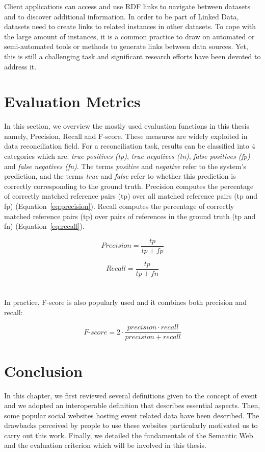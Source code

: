 Client applications can access and use RDF links to navigate between datasets and to discover additional information. In order to be part of Linked Data, datasets need to create links to related instances in other datasets. To cope with the large amount of instances, it is a common practice to draw on automated or semi-automated tools or methods to generate links between data sources. Yet, this is still a challenging task and significant research efforts have been devoted to address it.

\section{Evaluation Metrics} \label{sec:evaluation-metric-back}
In this section, we overview the mostly used evaluation functions in this thesis namely, Precision, Recall and F-score. These measures are widely exploited in data reconciliation field. For a reconciliation task, results can be classified into 4 categories which are: \textit{true positives (tp)}, \textit{true negatives (tn)}, \textit{false positives (fp)} and \textit{false negatives (fn)}. The terms \textit{positive} and \textit{negative} refer to the system's prediction, and the terms \textit{true} and \textit{false} refer to whether this prediction is correctly corresponding to the ground truth. Precision computes the percentage of correctly matched reference pairs (tp) over all matched reference pairs (tp and fp) (Equation~\ref{eq:precision}). Recall computes the percentage of correctly matched reference pairs (tp) over pairs of references in the ground truth (tp and fn) (Equation~\ref{eq:recall}).

\begin{equation} \label{eq:precision}
Precision= \frac{tp}{tp+fp}
\end{equation}

\begin{equation} \label{eq:recall}
Recall= \frac{tp}{tp+fn}
\end{equation}
\\
\\
In practice, F-score is also popularly used and it combines both precision and recall:

\begin{equation*}
F\textrm{-}score= 2 \cdot \frac{precision \cdot recall}{precision+recall}
\end{equation*}

\section{Conclusion}   \label{sec:conclusion}
In this chapter, we first reviewed several definitions given to the concept of event and we adopted an interoperable definition that describes essential aspects. Then, some popular social websites hosting event related data have been described. The drawbacks perceived by people to use these websites particularly motivated us to carry out this work. Finally, we detailed the fundamentals of the Semantic Web and the evaluation criterion which will be involved in this thesis.







